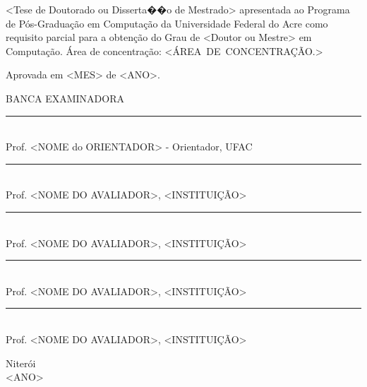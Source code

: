 \noindent
\begin{flushright}
\begin{minipage}[t]{8cm}

<Tese de Doutorado ou Disserta��o de Mestrado> apresentada ao Programa de P\'{o}s-Gradua\c{c}\~{a}o em Computa\c{c}\~{a}o da Universidade Federal do Acre como requisito parcial para a obten\c{c}\~{a}o do \mbox{Grau} de <Doutor ou Mestre> em Computa\c{c}\~{a}o. \'{A}rea de concentra\c{c}\~{a}o: \mbox{<\'AREA DE CONCENTRA\c{C}\~AO.>} %

\end{minipage}
\end{flushright}
\vspace{1.0 cm}
\noindent
Aprovada em <MES> de <ANO>. \\
\begin{flushright}
  \parbox{11cm}
  {
  \begin{center}
  BANCA EXAMINADORA \\
  \vspace{6mm}
  \rule{11cm}{.1mm} \\
    Prof. <NOME do ORIENTADOR> - Orientador, UFAC \\
    \vspace{6mm}
  \rule{11cm}{.1mm} \\
    Prof. <NOME DO AVALIADOR>, <INSTITUI\c{C}\~AO>\\
    \vspace{6mm}
  \rule{11cm}{.1mm} \\
    Prof. <NOME DO AVALIADOR>, <INSTITUI\c{C}\~AO>\\
  \vspace{4mm}
  \rule{11cm}{.1mm} \\
    Prof. <NOME DO AVALIADOR>, <INSTITUI\c{C}\~AO>\\
    \vspace{6mm}
  \rule{11cm}{.1mm} \\
    Prof. <NOME DO AVALIADOR>, <INSTITUI\c{C}\~AO>\\
  \vspace{6mm}
  \end{center}
  }
\end{flushright}
\begin{center}
  \vspace{4mm}
  Niter\'{o}i \\
  <ANO>

\end{center}

